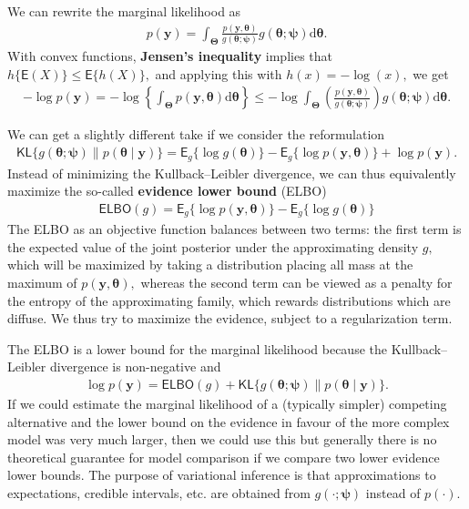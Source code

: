 \documentclass[
  11pt,
  letterpaper,
]{scrbook}
\theoremstyle{plain}
\theoremstyle{definition}
\theoremstyle{definition}
\theoremstyle{plain}
\theoremstyle{plain}
\theoremstyle{definition}
\theoremstyle{remark}
\begin{document}
We can rewrite the marginal likelihood as \begin{align*}
p(\boldsymbol{y}) = \int_{\boldsymbol{\Theta}}  \frac{p(\boldsymbol{y}, \boldsymbol{\theta})}{g(\boldsymbol{\theta};\boldsymbol{\psi})} g(\boldsymbol{\theta};\boldsymbol{\psi}) \mathrm{d} \boldsymbol{\theta}.
\end{align*} With convex functions, \textbf{Jensen's inequality} implies
that \(h\{\mathsf{E}(X)\} \leq \mathsf{E}\{h(X)\},\) and applying this
with \(h(x)=-\log(x),\) we get \begin{align*}
-\log p(\boldsymbol{y})  = -\log \left\{\int_{\boldsymbol{\Theta}} p(\boldsymbol{y}, \boldsymbol{\theta}) \mathrm{d} \boldsymbol{\theta}\right\} \leq - \log  \int_{\boldsymbol{\Theta}} \left(\frac{p(\boldsymbol{y}, \boldsymbol{\theta})}{g(\boldsymbol{\theta};\boldsymbol{\psi})}\right) g(\boldsymbol{\theta};\boldsymbol{\psi}) \mathrm{d} \boldsymbol{\theta}.
\end{align*}

We can get a slightly different take if we consider the reformulation
\begin{align*}
\mathsf{KL}\{g(\boldsymbol{\theta};\boldsymbol{\psi}) \parallel p(\boldsymbol{\theta} \mid \boldsymbol{y})\} = \mathsf{E}_{g}\{\log g(\boldsymbol{\theta})\} - \mathsf{E}_g\{\log p(\boldsymbol{y}, \boldsymbol{\theta})\} + \log p(\boldsymbol{y}).
\end{align*} Instead of minimizing the Kullback--Leibler divergence, we
can thus equivalently maximize the so-called \textbf{evidence lower
bound} (ELBO) \begin{align*}
\mathsf{ELBO}(g) = \mathsf{E}_g\{\log p(\boldsymbol{y}, \boldsymbol{\theta})\} - \mathsf{E}_{g}\{\log g(\boldsymbol{\theta})\}
\end{align*} The ELBO as an objective function balances between two
terms: the first term is the expected value of the joint posterior under
the approximating density \(g,\) which will be maximized by taking a
distribution placing all mass at the maximum of
\(p(\boldsymbol{y}, \boldsymbol{\theta}),\) whereas the second term can
be viewed as a penalty for the entropy of the approximating family,
which rewards distributions which are diffuse. We thus try to maximize
the evidence, subject to a regularization term.

The ELBO is a lower bound for the marginal likelihood because the
Kullback--Leibler divergence is non-negative and \begin{align*}
\log p(\boldsymbol{y}) = \mathsf{ELBO}(g) +  \mathsf{KL}\{g(\boldsymbol{\theta};\boldsymbol{\psi}) \parallel p(\boldsymbol{\theta} \mid \boldsymbol{y})\}.
\end{align*} If we could estimate the marginal likelihood of a
(typically simpler) competing alternative and the lower bound on the
evidence in favour of the more complex model was very much larger, then
we could use this but generally there is no theoretical guarantee for
model comparison if we compare two lower evidence lower bounds. The
purpose of variational inference is that approximations to expectations,
credible intervals, etc. are obtained from
\(g(\cdot; \boldsymbol{\psi})\) instead of \(p(\cdot).\)
\end{document}
